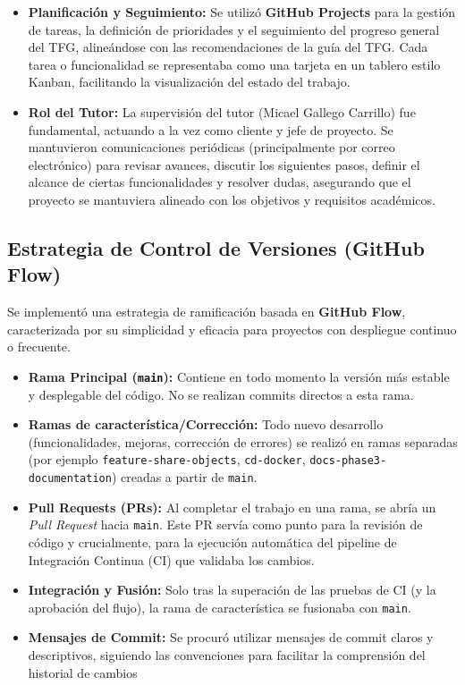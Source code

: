     \begin{itemize}
        \item \textbf{Planificación y Seguimiento:} Se utilizó \textbf{GitHub Projects} para la gestión de tareas, la definición de prioridades y el seguimiento del progreso general del TFG, alineándose con las recomendaciones de la guía del TFG. Cada tarea o funcionalidad se representaba como una tarjeta en un tablero estilo Kanban, facilitando la visualización del estado del trabajo.
        \item \textbf{Rol del Tutor:} La supervisión del tutor (Micael Gallego Carrillo) fue fundamental, actuando a la vez como cliente y jefe de proyecto. Se mantuvieron comunicaciones periódicas (principalmente por correo electrónico) para revisar avances, discutir los siguientes pasos, definir el alcance de ciertas funcionalidades y resolver dudas, asegurando que el proyecto se mantuviera alineado con los objetivos y requisitos académicos.
    \end{itemize}

\subsection{Estrategia de Control de Versiones (GitHub Flow)}
\label{sec:estrategiaGit}

Se implementó una estrategia de ramificación basada en \textbf{GitHub Flow}, caracterizada por su simplicidad y eficacia para proyectos con despliegue continuo o frecuente.
    \begin{itemize}
        \item \textbf{Rama Principal (\texttt{main}):} Contiene en todo momento la versión más estable y desplegable del código. No se realizan commits directos a esta rama.
        \item \textbf{Ramas de característica/Corrección:} Todo nuevo desarrollo (funcionalidades, mejoras, corrección de errores) se realizó en ramas separadas (por ejemplo \texttt{feature-share-objects}, \texttt{cd-docker}, \texttt{docs-phase3-documentation}) creadas a partir de \texttt{main}.
        \item \textbf{Pull Requests (PRs):} Al completar el trabajo en una rama, se abría un \textit{Pull Request} hacia \texttt{main}. Este PR servía como punto para la revisión de código y crucialmente, para la ejecución automática del pipeline de Integración Continua (CI) que validaba los cambios.
        \item \textbf{Integración y Fusión:} Solo tras la superación de las pruebas de CI (y la aprobación del flujo), la rama de característica se fusionaba con \texttt{main}.
        \item \textbf{Mensajes de Commit:} Se procuró utilizar mensajes de commit claros y descriptivos, siguiendo las convenciones para facilitar la comprensión del historial de cambios
    \end{itemize}

